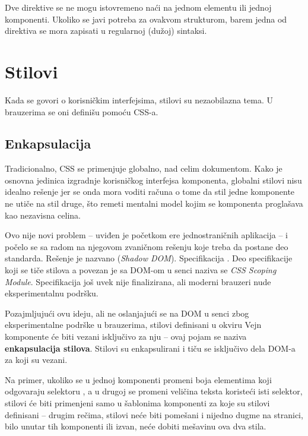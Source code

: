 Dve direktive se ne mogu istovremeno naći na jednom elementu ili jednoj komponenti.
Ukoliko se javi potreba za ovakvom strukturom, barem jedna od direktiva se mora zapisati u regularnoj (dužoj) sintaksi.

\section{Stilovi}

Kada se govori o korisničkim interfejsima, stilovi su nezaobilazna tema.
U brauzerima se oni definišu pomoću CSS-a.

\subsection{Enkapsulacija}

Tradicionalno, CSS se primenjuje globalno, nad celim dokumentom.
Kako je osnovna jedinica izgradnje korisničkog interfejsa komponenta, globalni stilovi nisu idealno rešenje jer se onda mora voditi računa o tome da stil jedne komponente ne utiče na stil druge, što remeti mentalni model kojim se komponenta proglašava kao nezavisna celina.

Ovo nije novi problem -- uviđen je početkom ere jednostraničnih aplikacija -- i počelo se sa radom na njegovom zvaničnom rešenju koje treba da postane deo standarda.
Rešenje je nazvano  (\textsl{Shadow DOM}).
Specifikacija .
Deo specifikacije koji se tiče stilova a povezan je sa DOM-om u senci naziva se \textsl{CSS Scoping Module}.
Specifikacija još uvek nije finalizirana, ali moderni brauzeri nude eksperimentalnu podršku.

Pozajmljujući ovu ideju, ali ne oslanjajući se na DOM u senci zbog eksperimentalne podrške u brauzerima, stilovi definisani u okviru Vejn komponente će biti vezani isključivo za nju -- ovaj pojam se naziva \textbf{enkapsulacija stilova}.
Stilovi su enkapsulirani i tiču se isključivo dela DOM-a za koji su vezani.

Na primer, ukoliko se u jednoj komponenti promeni boja elementima koji odgovaraju selektoru , a u drugoj se promeni veličina teksta koristeći isti selektor, stilovi će biti primenjeni samo u šablonima komponenti za koje su stilovi definisani -- drugim rečima, stilovi neće biti pomešani i nijedno dugme na stranici, bilo unutar tih komponenti ili izvan, neće dobiti mešavinu ova dva stila.

